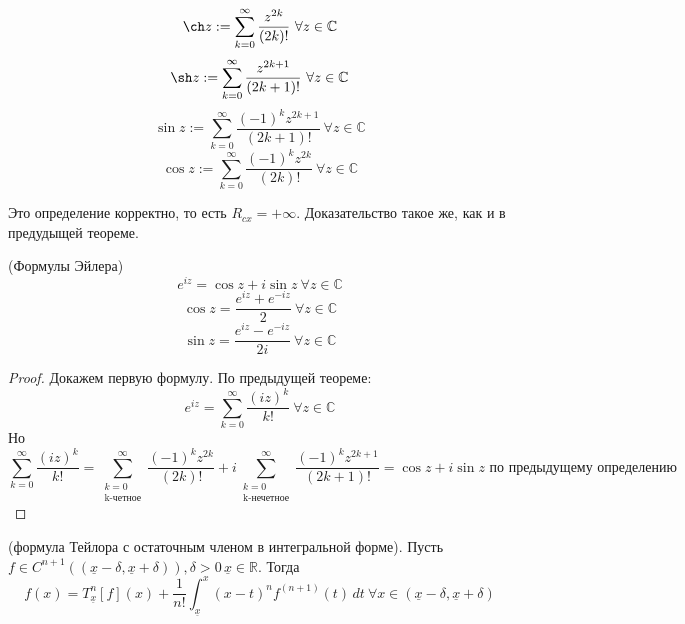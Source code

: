 \documentclass[11pt]{article}
\begin{document}
\begin{definition}
    \[ \ch z:= \sum_{k=0}^{\infty} \frac{z^{2k}}{(2k)!} \ \forall z\in \mathbb{C} \]   
    \[ \sh z := \sum_{k=0}^{\infty} \frac{z^{2k+1}}{(2k+1)!} \ \forall z\in \mathbb{C} \]   
    \[ \sin z:= \sum_{k=0}^{\infty} \frac{(-1)^k z^{2k+1}}{(2k+1)!} \ \forall z\in \mathbb{C} \] 
    \[ \cos z:= \sum_{k=0}^{\infty} \frac{(-1)^k z^{2k}}{(2k)!} \ \forall z\in \mathbb{C} \]   
\end{definition}


\begin{remark}
    Это определение корректно, то есть $R_{cx} = +\infty$. Доказательство такое же, как и в предудыщей теореме.
\end{remark}

\begin{consequence}
    (Формулы Эйлера)
    \[ e^{iz} = \cos z+i\sin z \ \forall z\in \mathbb{C}\]
    \[ \cos z = \frac{e^{iz}+e^{-iz}}{2} \ \forall z\in \mathbb{C} \] 
    \[ \sin z= \frac{e^{iz}-e^{-iz}}{2i} \ \forall z\in \mathbb{C} \]
\end{consequence}

\begin{proof}
    Докажем первую формулу. По предыдущей теореме:
    \[ e^{iz} = \sum_{k=0}^{\infty} \frac{(iz)^k}{k!} \ \forall z\in \mathbb{C} \]   
    Но 
    \[ \sum_{k=0}^{\infty} \frac{(iz)^k}{k!} = \sum_{\substack{k=0 \\ \text{k-четное}}}^{\infty} \frac{(-1)^k z^{2k}}{(2k)!} +  i\sum_{\substack{k=0 \\ \text{k-нечетное}}}^{\infty} \frac{(-1)^k z^{2k+1}}{(2k+1)!} = \cos z+i\sin z \text{ по предыдущему определению}\]
\end{proof}

\begin{theorem}
    (формула Тейлора с остаточным членом в интегральной форме). Пусть $f\in C^{n+1} ((\underline{x}-\delta, \underline{x}+\delta)), \delta>0 \, \underline{x}\in \mathbb{R}$. Тогда
    \[ f(x) = T_{\underline{x}}^n [f](x) + \frac{1}{n!} \int_{\underline{x}}^{x} (x-t)^n f^{(n+1)}(t)\, dt \ \forall x\in (\underline{x}-\delta, \underline{x}+\delta) \]
\end{theorem}
\end{document}
